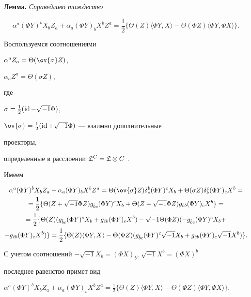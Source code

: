 {\bf Лемма.} {\it Справедливо тождество}


$$


\alpha^a(\Phi Y)^b X_b Z_a+\alpha_a(\Phi Y)_b X^b Z^a =


\frac 12 \{ \Theta (Z) \langle \Phi Y,X \rangle- 


\Theta (\Phi Z) \langle \Phi Y,\Phi X \rangle \}.


$$ 





\begin{pf}


Воспользуемся соотношениями


$\alpha^a Z_a=\Theta(\ov{\sigma} Z)$,


$\alpha_a Z^a=\Theta(\sigma Z),$


где 


$\sigma =\frac 12 (\operatorname{id}-\sqrt{-1}\Phi)$,


$\ov{\sigma}=\frac 12 (\id+\sqrt{-1}\Phi)$ --- взаимно дополнительные 


проекторы, 


определенные в расслоении $\frak L^C=\frak L\otimes C$ \cite{8}.


Имеем


\begin{multline*}


\alpha^a(\Phi Y)^b X_b Z_a+\alpha_a(\Phi Y)_b X^b Z^a=


\Theta(\ov{\sigma} Z)\delta^b_c(\Phi Y)^c X_b+


\Theta(\sigma Z)\delta^c_b(\Phi Y)_c X^b= \\


=\frac 12 \{\Theta(Z+\sqrt{-1}\Phi Z)g_{\Hat b c}(\Phi Y)^c X_b +


\Theta(Z-\sqrt{-1}\Phi Z)g_{\Hat c b}(\Phi Y)_c X^b\}=\\


=\frac 12 \{\Theta(Z)(g_{\Hat b c}(\Phi Y)^c X_b+g_{\Hat c b}(\Phi Y)_c X^b)-


\sqrt {-1} \Theta(\Phi Z)(-g_{\Hat b c}(\Phi Y)^c X_b+\\


+g_{\Hat c b}(\Phi Y)_c X^b) \}=


\frac 12 \{\Theta(Z)\langle \Phi Y,X \rangle 


-\Theta(\Phi Z)(g_{\Hat b c}(\Phi Y)^c \sqrt{-1} X_b+


g_{\Hat c b}(\Phi Y)_c \sqrt{-1} X^b) \}.


\end{multline*}


С учетом соотношений $-\sqrt{-1}X_b=(\Phi X)_b$, $\sqrt{-1}X^b=(\Phi X)^b$ 


последнее равенство примет вид


$\alpha^a(\Phi Y)^b X_b Z_a+\alpha_a(\Phi Y)_b X^b Z^a =


\frac 12 \{ \Theta (Z) \langle \Phi Y,X \rangle- 


\Theta (\Phi Z) \langle \Phi Y,\Phi X \rangle \}$.


\end{pf}





